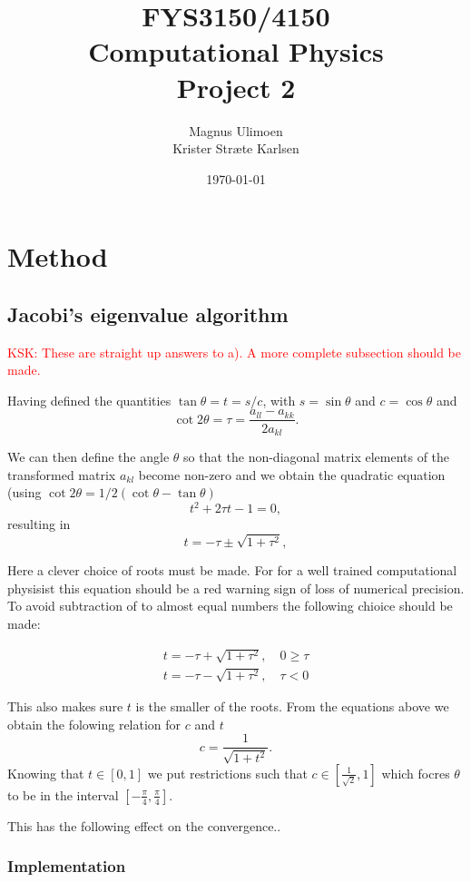 \documentclass[11pt,a4paper,english]{article}
\title{FYS3150/4150\\Computational Physics\\Project 2}
\author{Magnus Ulimoen\\Krister Stræte Karlsen}
\date{\today}
\numberwithin{equation}{section}
\begin{document}
\maketitle

\section{Method}

 
\subsection{Jacobi's eigenvalue algorithm}

\textcolor{red}{KSK: These are straight up answers to a). A more complete subsection should be made.}

Having defined the quantities $\tan\theta = t= s/c$, with $s=\sin\theta$ and $c=\cos\theta$ and
\[\cot 2\theta=\tau = \frac{a_{ll}-a_{kk}}{2a_{kl}}.
\]

We can then define the angle $\theta$ so that the non-diagonal matrix elements of the transformed matrix 
$a_{kl}$ become non-zero and
we obtain the quadratic equation (using $\cot 2\theta=1/2(\cot \theta-\tan\theta)$
\[
t^2+2\tau t-1= 0,
\]
resulting in 
\[
  t = -\tau \pm \sqrt{1+\tau^2},
\]

Here a clever choice of roots must be made. For for a well trained computational physisist this equation should be a red warning sign of loss of numerical precision. To avoid subtraction of to almost equal numbers the following chioice should be made:

\begin{align*}
t=  -\tau + \sqrt{1+\tau^2}, \quad   0  \geq \tau \\
t=  -\tau - \sqrt{1+\tau^2}, \quad   \tau <  0
\end{align*}

This also makes sure $t$ is the smaller of the roots. From the equations above we obtain the folowing relation for $c$ and $t$
\[
   c = \frac{1}{\sqrt{1+t^2}}.
\]
Knowing that $t \in [0,1]$ we put restrictions such that $c \in [\frac{1}{\sqrt{2}}, 1]$ which focres $\theta$ to be in the interval $[- \frac{\pi}{4},\frac{\pi}{4}]$.  

This has the following effect on the convergence.. 

\subsubsection{Implementation}
\end{document}
